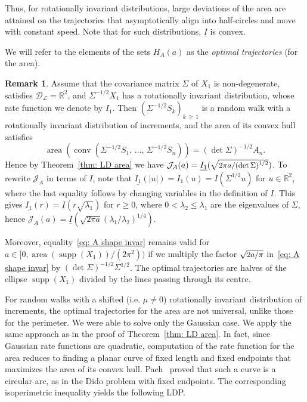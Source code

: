 \documentclass[10pt]{amsart}
\theoremstyle{definition}\newtheorem{defi}[theo]{Definition}\newtheorem{rema}[theo]{Remark}\newtheorem{exam}[theo]{Example}\newtheorem{exem}[theo]{Example}\newtheorem{nota}[theo]{Notation}
\DeclareMathOperator{\area}{area}
\DeclareMathOperator{\conv}{conv}
\newcommand{\ubar}[1]{\underline{#1}}
\newcommand{\Rbb}{\mathbb{R}}
\newcommand{\Dcl}{\mathcal{D}}
\newcommand{\Lcl}{\mathcal{L}}
\newcommand{\Jcl}{\mathcal{J}}
\newcommand{\supp}{\mathop{\mathrm{supp}}\nolimits}
\begin{document}
Thus, for rotationally invariant distributions, large deviations of the area are attained on the trajectories that asymptotically align into half-circles and move with constant speed. Note that for such distributions, $\ubar I$ is convex.

We will refer to the elements of the sets $H_A(a)$ as the \emph{optimal trajectories} (for the area).

\begin{rema}\label{Rem: elliptic}
Assume that the covariance matrix $\Sigma$ of $X_1$ is non-degenerate, satisfies $\Dcl_{\Lcl}=\Rbb^2$, and $\Sigma^{-1/2} X_1$ has a rotationally invariant distribution, whose rate function we denote by $I_1$. Then $(\Sigma^{-1/2} S_k)_{k\,\ge \,1}$ is a random walk with a rotationally invariant distribution of increments, and the area of its convex hull satisfies
\[
\area\left(\conv\left(\Sigma^{-1/2} S_1,\,\dots,\,\Sigma^{-1/2} S_n\right)\right) = (\det \Sigma)^{-1/2} A_n.
\]
Hence by Theorem~\ref{thm: LD area} we have $\Jcl_A(a)=\ubar {I_1} (\sqrt{\text{\small{$2 \pi a/ (\det \Sigma)^{1/2}$}}})$. To rewrite $\Jcl_A$ in terms of $I$, note that $\ubar {I_1} (|u|) = I_1(u) = I(\Sigma^{1/2} u)$ for $u \in \Rbb^2$, where the last equality follows by changing variables in the definition of $I$. This gives $\ubar {I_1} (r)= \ubar I (r \sqrt{\lambda_1})$ for $r \ge 0$, where $0< \lambda_2 \le \lambda_1$ are the eigenvalues of $\Sigma$, hence $\Jcl_A(a)=\ubar I (\sqrt{2 \pi a } (\lambda_1 / \lambda_2)^{1/4})$.

Moreover, equality~\eqref{eq: A shape invar} remains valid for $a\in [0, \area(\supp(X_1))/(2 \pi^2))$ if we multiply the factor $\sqrt{\text{\small{$2a/\pi$}}}$ in~\eqref{eq: A shape invar} by $(\det \Sigma)^{-1/2} \Sigma^{1/2}$. The optimal trajectories are halves of the ellipse $\supp(X_1)$ divided by the lines passing through its centre.
\end{rema}

For random walks with a shifted (i.e. $\mu \neq 0$) rotationally invariant distribution of increments, the optimal trajectories for the area are not universal, unlike those for the perimeter. We were able to solve only the Gaussian case. We apply the same approach as in the proof of Theorem~\ref{thm: LD area}. In fact, since Gaussian rate functions are quadratic, computation of the rate function for the area reduces to finding a planar curve of fixed length and fixed endpoints that maximizes the area of its convex hull. Pach~\cite{pach1978isoperimetric} proved that such a curve is a circular arc, as in the Dido problem with fixed endpoints. The corresponding isoperimetric inequality yields the following LDP.
\end{document}
